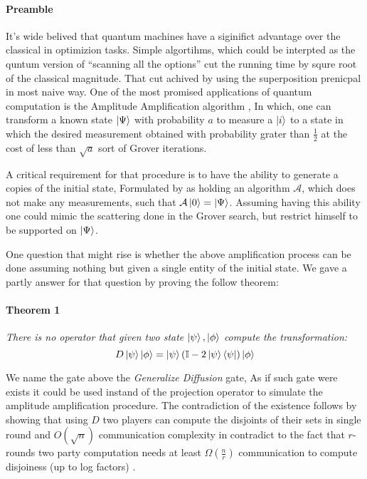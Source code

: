 \documentclass{article}
\begin{document}
\begin{multicols}{2}

\paragraph{Preamble} It's wide belived that quantum machines have a siginifict advantage over the classical in optimizion tasks. Simple algortihms, which could be interpted as the quntum version of ``scanning all the options'' cut the running time by squre root of the classical magnitude. That cut achived by using the superposition prenicpal in most naive way.
One of the most promised applications of quantum computation is the Amplitude Amplification algorithm \cite{Brassard_2002}, In which, one can transform a known state $\ket{\Psi}$  with probability $a$ to measure a $\ket{i}$ to a state in which the desired measurement obtained with probability grater than $\frac{1}{2}$ at the cost of less than $\sqrt{a}$ sort of Grover iterations.
  
  A critical requirement for that procedure is to have the ability to generate a copies of the initial state, Formulated by \cite{Brassard_2002} as holding an algorithm $\mathcal{A}$, which does not make any measurements, such that $\mathcal{A}\ket{0}=\ket{\Psi}$. Assuming having this ability one could mimic the scattering done in the Grover search, but restrict himself to be supported on $\ket{\Psi}$. 


  One question that might rise is whether the above amplification process can be done assuming nothing but given a single entity of the initial state. We gave a partly answer for that question by proving the follow theorem: 

  \paragraph{Theorem 1} \textit{ There is no operator that given two state $\ket{\psi},\ket{\phi}$ compute the transformation:} 
\begin{equation*}
    D \ket{\psi}\ket{\phi} = \ket{\psi}\left( \mathbb{I} - 2 \ket{\psi}\bra{\psi} \right)\ket{\phi} 
\end{equation*}

We name the gate above the \textit{Generalize Diffusion} gate, As if such gate were exists it could be used instand of the projection operator to simulate the amplitude amplification procedure. The contradiction of the existence follows by showing that using $D$ two players can compute the disjoints of their sets in single round and $O\left( \sqrt{n} \right)$ communication complexity in contradict to the fact that $r$-rounds two party computation needs at least $\Omega\left( \frac{n}{r} \right)$ communication to compute disjoiness (up to log factors) \cite{Braverman}.    


\end{multicols}
\end{document}
